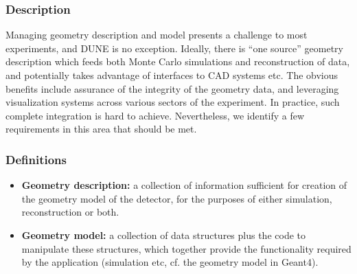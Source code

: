 \subsubsection{Description}

Managing geometry description and model presents a challenge to most experiments, and DUNE is no exception. Ideally, there is ``one source'' geometry description which feeds both Monte Carlo simulations and reconstruction of data, and potentially takes advantage of interfaces to CAD systems etc. The obvious benefits include assurance of the integrity of the geometry data, and leveraging visualization systems across various sectors of the experiment. In practice, such complete integration is hard to achieve. Nevertheless, we identify  a few requirements in this area that should be met.

\subsubsection{Definitions}
\begin{itemize}
	\item  \textbf{Geometry description:} a collection of information sufficient for creation of the geometry model of the detector, for the purposes of either simulation, reconstruction or both.
	\item  \textbf{Geometry model:} a collection of data structures plus the code to manipulate these structures, which together provide the functionality required by the application (simulation etc, cf. the geometry model in Geant4).
\end{itemize}

